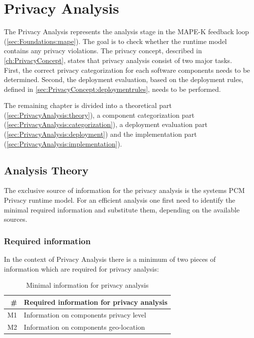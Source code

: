 \chapter{Privacy Analysis}
\label{ch:PrivacyAnalysis}

The Privacy Analysis represents the analysis stage in the MAPE-K feedback loop (\autoref{sec:Foundations:mape}). The goal is to check whether the runtime model contains any privacy violations. The privacy concept, described in \autoref{ch:PrivacyConcept}, states that privacy analysis consist of two major tasks. First, the correct privacy categorization for each software components needs to be determined. Second, the deployment evaluation, based on the deployment rules, defined in \autoref{sec:PrivacyConcept:deploymentrules}, needs to be performed.

The remaining chapter is divided into a theoretical part (\autoref{sec:PrivacyAnalysis:theory}), a component categorization part (\autoref{sec:PrivacyAnalysis:categorization}), a deployment evaluation part (\autoref{sec:PrivacyAnalysis:deployment}) and the implementation part (\autoref{sec:PrivacyAnalysis:implementation}).


\section{Analysis Theory}
\label{sec:PrivacyAnalysis:theory}

The exclusive source of information for the privacy analysis is the systems PCM Privacy runtime model. For an efficient analysis one first need to identify the minimal required information and substitute them, depending on the available sources.


\subsection{Required information}
In the context of Privacy Analysis there is a minimum of two pieces of information which are required for privacy analysis:

\begin{table}[h]
	\centering
	\begin{tabular}{r | l}
		\hline
		\textbf{\#} & \textbf{Required information for privacy analysis}\\
		\hline
		M1 & Information on components privacy level \\
		M2 & Information on components geo-location \\
		\hline
	\end{tabular}
	\caption{Minimal information for privacy analysis}
	\label{tab:pa_minimal_info}
\end{table}

